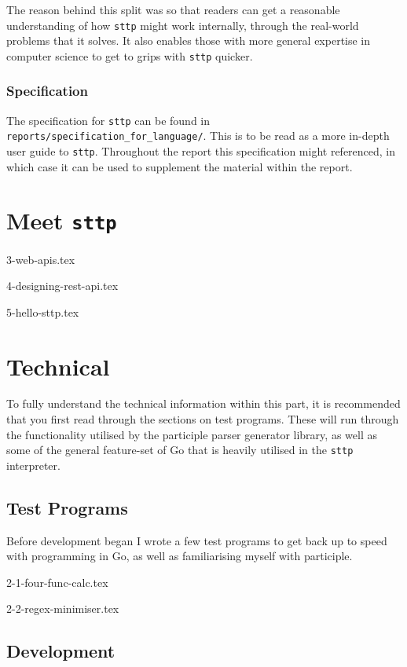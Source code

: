 \documentclass[]{full}
\theoremstyle{definition}
\begin{document}
The reason behind this split was so that readers can get a reasonable understanding of how \verb|sttp| might work internally, through the real-world problems that it solves. It also enables those with more general expertise in computer science to get to grips with \verb|sttp| quicker.

\section{Specification}

The specification for \verb|sttp| can be found in \verb|reports/specification_for_language/|. This is to be read as a more in-depth user guide to \verb|sttp|. Throughout the report this specification might referenced, in which case it can be used to supplement the material within the report.

\cprotect\part{Meet \verb|sttp|}

{3-web-apis.tex}

{4-designing-rest-api.tex}

{5-hello-sttp.tex}

\part{Technical}

To fully understand the technical information within this part, it is recommended that you first read through the sections on test programs. These will run through the functionality utilised by the participle parser generator library, as well as some of the general feature-set of Go that is heavily utilised in the \verb|sttp| interpreter.

\chapter{Test Programs}
\label{chap:test-programs}

Before development began I wrote a few test programs to get back up to speed with programming in Go, as well as familiarising myself with participle.

{2-1-four-func-calc.tex}

{2-2-regex-minimiser.tex}

\chapter{Development}
\label{chap:development}
\end{document}
